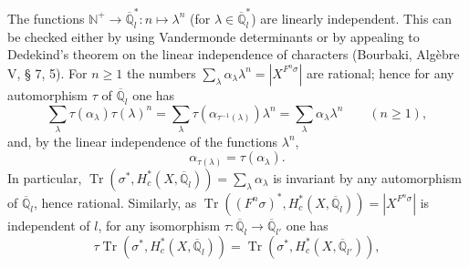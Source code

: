 \documentclass[9pt,twoside]{extarticle}
\begin{document}
{The functions \(\mathbb N^+\to\overline{\mathbb Q}_l^*:n\mapsto\lambda^n\) (for \(\lambda\in\overline{\mathbb Q}_l^*\)) are linearly independent. This can be checked either by using Vandermonde determinants or by appealing to Dedekind's theorem on the linear independence of characters (Bourbaki, Algèbre V, § 7, 5). For \(n\ge1\) the numbers \(\sum_\lambda\alpha_\lambda\lambda^n=|X^{F^n\sigma}|\) are rational; hence for any automorphism \(\tau\) of \(\overline{\mathbb Q}_l\) one has \[
\sum_\lambda\tau(\alpha_\lambda)\tau(\lambda)^n
=
\sum_\lambda\tau(\alpha_{\tau^{-1}(\lambda)})\lambda^n
=
\sum_\lambda\alpha_\lambda\lambda^n
\qquad(n\ge1),
\] and, by the linear independence of the functions \(\lambda^n\), \[
\alpha_{\tau(\lambda)}=\tau(\alpha_\lambda).
\] In particular, \(\operatorname{Tr}(\sigma^*,H_c^*(X,\overline{\mathbb Q}_l))=\sum_\lambda\alpha_\lambda\) is invariant by any automorphism of \(\overline{\mathbb Q}_l\), hence rational. Similarly, as \(\operatorname{Tr}((F^n\sigma)^*,H_c^*(X,\overline{\mathbb Q}_l))=|X^{F^n\sigma}|\) is independent of \(l\), for any isomorphism \(\tau:\overline{\mathbb Q}_l\to\overline{\mathbb Q}_{l'}\) one has \[
\tau\operatorname{Tr}(\sigma^*,H_c^*(X,\overline{\mathbb Q}_l))
=
\operatorname{Tr}(\sigma^*,H_c^*(X,\overline{\mathbb Q}_{l'})),
\]\par
}
\end{document}
